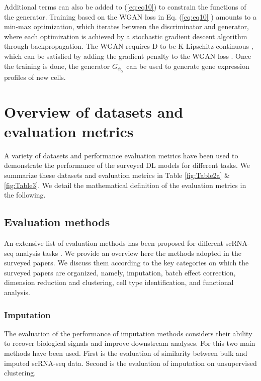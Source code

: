 \documentclass[
]{book}
\begin{document}
Additional terms can also be added to (\eqref{eq:eq10}) to constrain the functions of the generator. Training based on the WGAN loss in Eq. (\eqref{eq:eq10} ) amounts to a min-max optimization, which iterates between the discriminator and generator, where each optimization is achieved by a stochastic gradient descent algorithm through backpropagation. The WGAN requires D to be K-Lipschitz continuous \citep{RN104}, which can be satisfied by adding the gradient penalty to the WGAN loss \citep{RN103}. Once the training is done, the generator \(G_{\phi_{G}}\) can be used to generate gene expression profiles of new cells.

\hypertarget{ch-4}{%
\chapter{Overview of datasets and evaluation metrics}\label{ch-4}}

A variety of datasets and performance evaluation metrics have been used to demonstrate the performance of the surveyed DL models for different tasks. We summarize these datasets and evaluation metrics in Table \ref{fig:Table2a} \& \ref{fig:Table3}. We detail the mathematical definition of the evaluation metrics in the following.

\hypertarget{ch-4-1}{%
\section{Evaluation methods}\label{ch-4-1}}

An extensive list of evaluation methods has been proposed for different scRNA-seq analysis tasks \citep{RN44, RN45, RN43}. We provide an overview here the methods adopted in the surveyed papers. We discuss them according to the key categories on which the surveyed papers are organized, namely, imputation, batch effect correction, dimension reduction and clustering, cell type identification, and functional analysis.

\hypertarget{ch-4-1-1}{%
\subsection{Imputation}\label{ch-4-1-1}}

The evaluation of the performance of imputation methods considers their ability to recover biological signals and improve downstream analyses. For this two main methods have been used. First is the evaluation of similarity between bulk and imputed scRNA-seq data. Second is the evaluation of imputation on unsupervised clustering.
\end{document}
